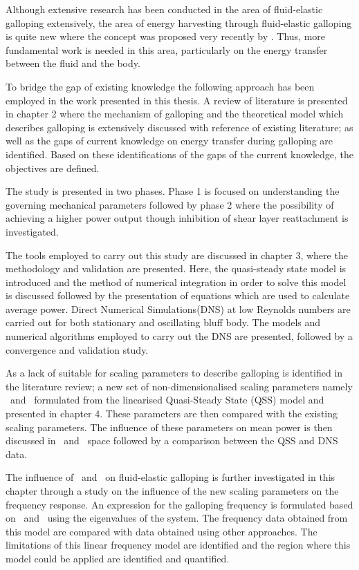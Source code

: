Although extensive research has been conducted in the area of fluid-elastic galloping extensively, the area of energy harvesting through fluid-elastic galloping is quite new where the concept was proposed very recently by \citet{Barrero-Gil2010a}. Thus, more fundamental work is needed in this area, particularly on the energy transfer between the fluid and the body.   
 
To bridge the gap of existing knowledge the following approach has been employed in the work presented in this thesis. A review of literature is presented in chapter 2 where the mechanism of galloping and the theoretical model which describes galloping is extensively discussed with reference of existing literature; as well as the  gaps of current knowledge on energy transfer during galloping are identified. Based on these identifications of the gaps of the current knowledge, the objectives are defined.

The study is presented in two phases. Phase 1 is focused on understanding the governing mechanical parameters followed by phase 2 where the possibility of achieving a higher power output though inhibition of shear layer reattachment is investigated.  

The tools employed to carry out this study are discussed in chapter 3, where the methodology and validation are presented. Here, the quasi-steady state model is introduced and the method of numerical integration in order to solve this model is discussed followed by the presentation of equations which are used to calculate average power. Direct Numerical Simulations(DNS) at low Reynolds numbers are carried out for both stationary and  oscillating bluff body. The models and numerical algorithms employed to carry out the DNS are presented, followed by a convergence and validation study.  

As a lack of suitable for scaling parameters to describe galloping is identified in the literature review; a new set of non-dimensionalised scaling parameters namely \massstiff\ and \massdamp\ formulated from the linearised Quasi-Steady State (QSS) model and presented in chapter 4. These parameters are then compared with the existing scaling parameters. The influence of these parameters on mean power is then discussed in \massstiff\ and \massdamp\ space followed by a comparison between the QSS and DNS data.

The influence of \massstiff\ and \massdamp\ on fluid-elastic galloping is further investigated in this chapter through a study on the influence of the new scaling parameters on the frequency response. An expression for the galloping frequency is formulated based on \massstiff\ and \massdamp\ using the eigenvalues of the system. The frequency data obtained from this model are compared with data obtained using other approaches. The limitations of this linear frequency model are identified and the region where this model could be applied are identified and quantified.

